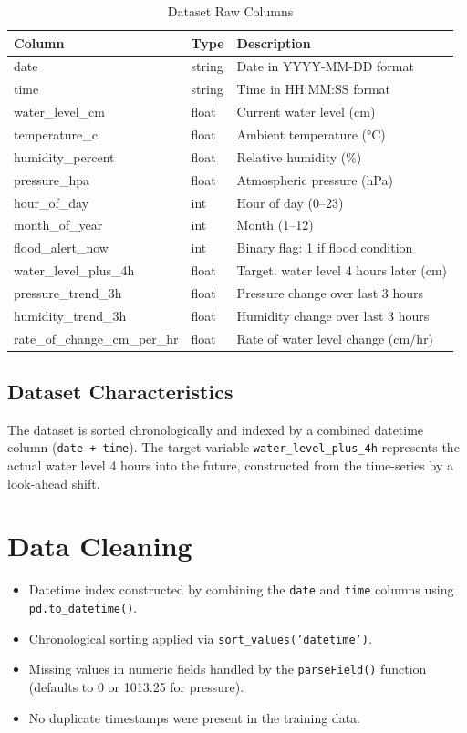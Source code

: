 \begin{table}[H]
\centering
\caption{Dataset Raw Columns}
\begin{tabularx}{\linewidth}{|l|l|X|}
\hline
\rowcolor{FloodLight}
\textbf{Column} & \textbf{Type} & \textbf{Description} \\
\hline
date & string & Date in YYYY-MM-DD format \\
time & string & Time in HH:MM:SS format \\
water\_level\_cm & float & Current water level (cm) \\
temperature\_c & float & Ambient temperature (°C) \\
humidity\_percent & float & Relative humidity (\%) \\
pressure\_hpa & float & Atmospheric pressure (hPa) \\
hour\_of\_day & int & Hour of day (0--23) \\
month\_of\_year & int & Month (1--12) \\
flood\_alert\_now & int & Binary flag: 1 if flood condition \\
water\_level\_plus\_4h & float & Target: water level 4 hours later (cm) \\
pressure\_trend\_3h & float & Pressure change over last 3 hours \\
humidity\_trend\_3h & float & Humidity change over last 3 hours \\
rate\_of\_change\_cm\_per\_hr & float & Rate of water level change (cm/hr) \\
\hline
\end{tabularx}
\end{table}

\subsection{Dataset Characteristics}

The dataset is sorted chronologically and indexed by a combined datetime column (\texttt{date + time}). The target variable \texttt{water\_\allowbreak{}level\_\allowbreak{}plus\_\allowbreak{}4h} represents the actual water level 4 hours into the future, constructed from the time-series by a look-ahead shift.

\section{Data Cleaning}

\begin{itemize}[leftmargin=1.5em]
  \item Datetime index constructed by combining the \texttt{date} and \texttt{time} columns using \texttt{pd.\allowbreak{}to\_\allowbreak{}datetime()}.
  \item Chronological sorting applied via \texttt{sort\_\allowbreak{}values('datetime')}.
  \item Missing values in numeric fields handled by the \texttt{parseField()} function (defaults to 0 or 1013.25 for pressure).
  \item No duplicate timestamps were present in the training data.
\end{itemize}

